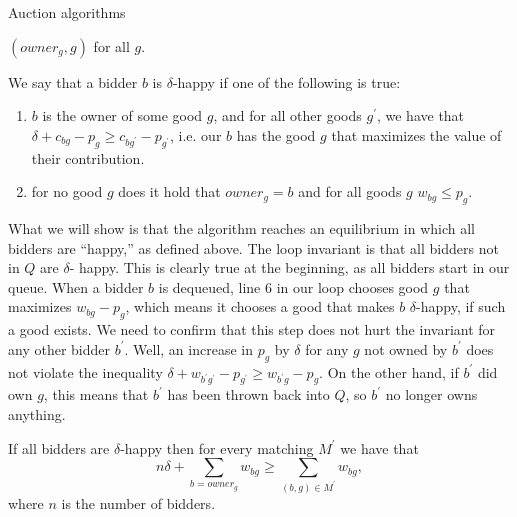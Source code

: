 \documentclass[11pt]{article}
\renewcommand{\'}{^{'}}
\newenvironment{lemma}[2][Lemma]{\begin{trivlist}
\item[\hskip \labelsep {\bfseries #1}\hskip \labelsep {\bfseries #2.}]}{\end{trivlist}}
\newenvironment{definition}[2][Definition]{\begin{trivlist}
\item[\hskip \labelsep {\bfseries #1}\hskip \labelsep {\bfseries #2.}]}{\end{trivlist}}
\begin{document}
\begin{section}{Auction algorithms}
\begin{codebox}
					\End
			\End
		\li \Return $(owner_g,g)$ for all $g$.
	\end{codebox}
	\doublespacing
	\begin{definition}{}
		We say that a bidder $b$ is $\delta$-happy if one of the following is true:
		\begin{enumerate}
			\item $b$ is the owner of some good $g$, and for all other goods $g\'$, we have 
				that $\delta + c_{bg} - p_g \geq c_{bg\'} - p_{g\'}$, i.e. our $b$ 
				has the good $g$ that maximizes the value of their contribution.
			\item for no good $g$ does it hold that $owner_g = b$ and for all goods $g$ 
				$w_{bg} \leq p_g$.
		\end{enumerate}
	\end{definition}

	What we will show is that the algorithm reaches an equilibrium in which all bidders are 
	``happy,'' as defined above. The loop invariant is that all bidders not in $Q$ are $\delta$-
	happy. This is clearly true at the beginning, as all bidders start in our queue. When a bidder 
	$b$ is dequeued, line $6$ in our loop chooses good $g$ that maximizes $w_{bg} - p_g$, which 
	means it chooses a good that makes $b$ $\delta$-happy, if such a good exists. We need to confirm 
	that this step does not hurt the invariant for any other bidder $b\'$. Well, an increase in 
	$p_g$ by $\delta$ for any $g$ not owned by $b\'$ does not violate the inequality $\delta + 
	w_{b\' g\'} - p_{g\'} \geq w_{b\' g} - p_g$. On the other hand, if $b\'$ did own $g$, this means 
	that $b\'$ has been thrown back into $Q$, so $b\'$ no longer owns anything.
	\begin{lemma}{}
		If all bidders are $\delta$-happy then for every matching $M\'$ we have that 
		\[
			n\delta + \sum_{b = owner_g} w_{bg} \geq \sum_{(b,g)\in M\'} w_{bg},
		\]
		where $n$ is the number of bidders. 
	\end{lemma}


\end{section}
\end{document}
